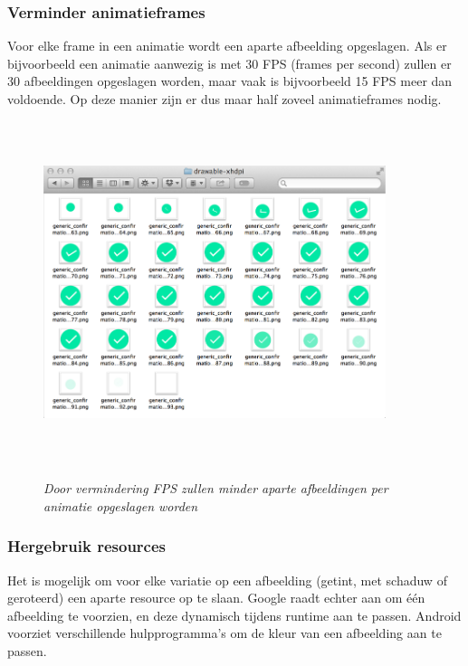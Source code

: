 \subsubsection{Verminder animatieframes }
\label{sec:reduceanimationframes}
Voor elke frame in een animatie wordt een aparte afbeelding opgeslagen. Als er bijvoorbeeld een animatie aanwezig is met 30 FPS (frames per second) zullen er 30 afbeeldingen opgeslagen worden, maar vaak is bijvoorbeeld 15 FPS meer dan voldoende. Op deze manier zijn er dus maar half zoveel animatieframes nodig.
\begin{figure}[H]
	\centering
	\caption{\textit{Door vermindering FPS zullen minder aparte afbeeldingen per animatie opgeslagen worden}\newline}
	\includegraphics[width=10cm, height=10cm, keepaspectratio]{img/animation-frames}\\[.5cm]
	
\end{figure}
\subsubsection{Hergebruik resources }
\label{sec:reuseresources}
Het is mogelijk om voor elke variatie op een afbeelding (getint, met schaduw of geroteerd) een aparte resource op te slaan. Google raadt echter aan om één afbeelding te voorzien, en deze dynamisch tijdens runtime aan te passen. 
Android voorziet verschillende hulpprogramma's om de kleur van een afbeelding aan te passen.
